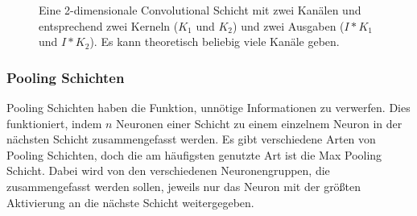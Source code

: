\documentclass[10pt]{article}
\newcommand{\eng}[1]{\textit{#1}}
\newcommand{\threesub}[1]{
        \vspace{1.5ex}
        \noindent {\textbf{#1}}
        \vspace{0.5ex}
    }
\begin{document}
\begin{figure}[h!]
    \caption{Eine 2-dimensionale Convolutional Schicht mit zwei Kanälen und entsprechend zwei Kerneln ($K_1$ und $K_2$) und zwei Ausgaben ($I*K_1$ und $I*K_2$). Es kann theoretisch beliebig viele Kanäle geben.}
    \label{fig:conv_layers_channels}
\end{figure}


\subsubsection{Pooling Schichten}

Pooling Schichten haben die Funktion, unnötige Informationen zu verwerfen. 
Dies funktioniert, indem $n$ Neuronen einer Schicht zu einem einzelnem Neuron in der nächsten Schicht zusammengefasst werden.
Es gibt verschiedene Arten von Pooling Schichten, doch die am häufigsten genutzte Art ist die Max Pooling Schicht. 
Dabei wird von den verschiedenen Neuronengruppen, die zusammengefasst werden sollen, jeweils nur das Neuron mit der größten Aktivierung an die nächste Schicht weitergegeben.




\end{document}
